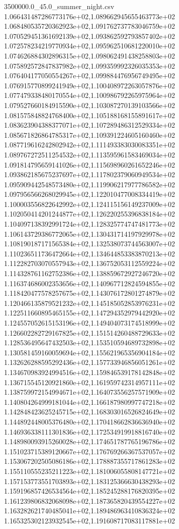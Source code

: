 \begin{filecontents*}{3500000.0_45.0_summer_night.csv}
1.066431487286773176e+02,1.089662945655463773e+02
1.068480535720362923e+02,1.091762737783046759e+02
1.070529451361692139e+02,1.093862592793857402e+02
1.072578234219770934e+02,1.095962510681220010e+02
1.074626884302896315e+02,1.098062491438258803e+02
1.075892572847837982e+02,1.099359992326035353e+02
1.076404177050554267e+02,1.099884476956749495e+02
1.076915770899241949e+02,1.100408972263057876e+02
1.077479338480170554e+02,1.100986792265975964e+02
1.079527660184915590e+02,1.103087270139103566e+02
1.081575848824768400e+02,1.105188168155891617e+02
1.083623904388377071e+02,1.107289486312529334e+02
1.085671826864785317e+02,1.109391224605160460e+02
1.087719616242802942e+02,1.111493383030083351e+02
1.089767272511254532e+02,1.113595961583469034e+02
1.091814795659141026e+02,1.115698960261652246e+02
1.093862185675237697e+02,1.117802379060949534e+02
1.095909442548573480e+02,1.119906217977786582e+02
1.097956566268029945e+02,1.122010477008334419e+02
1.100003556822642992e+02,1.124115156149237009e+02
1.102050414201244877e+02,1.126220255396838184e+02
1.104097138392991724e+02,1.128325774747481773e+02
1.106143729386772065e+02,1.130431714197929978e+02
1.108190187171565384e+02,1.132538073744563007e+02
1.110236511736472664e+02,1.134644853383870213e+02
1.112282703070557943e+02,1.136752053112559224e+02
1.114328761162752386e+02,1.138859672927246720e+02
1.116374686002353656e+02,1.140967712824594855e+02
1.118420477578257675e+02,1.143076172801274879e+02
1.120466135879521232e+02,1.145185052853976231e+02
1.122511660895465155e+02,1.147294352979442920e+02
1.124557052615153196e+02,1.149404073174518999e+02
1.126602282729167825e+02,1.151514260488729633e+02
1.128536495647432503e+02,1.153510594689732898e+02
1.130581459160059694e+02,1.155621965356904184e+02
1.132626288595292436e+02,1.157733946856051261e+02
1.134670983924994516e+02,1.159846539178142848e+02
1.136715545120921860e+02,1.161959742314957111e+02
1.138759972154994671e+02,1.164073556257571909e+02
1.140804264999181044e+02,1.166187980997747218e+02
1.142848423625245715e+02,1.168303016526824649e+02
1.144892448005376480e+02,1.170418662836636940e+02
1.146936338111301836e+02,1.172534919918816740e+02
1.148980093915260028e+02,1.174651787765196786e+02
1.151023715389120667e+02,1.176769266367537057e+02
1.153067202505086186e+02,1.178887355717861283e+02
1.155110555235211223e+02,1.181006055808147721e+02
1.157153773551703893e+02,1.183125366630438293e+02
1.159196857426534564e+02,1.185245288176820395e+02
1.161239806832068098e+02,1.187365820439554227e+02
1.163282621740485041e+02,1.189486963410836324e+02
1.165325302123932545e+02,1.191608717083117881e+02

\end{filecontents*}
